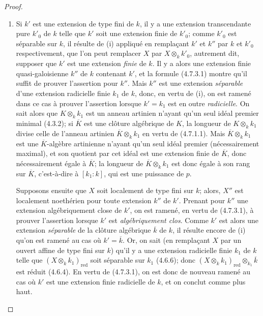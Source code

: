 \begin{proof}
\begin{enumerate}
\item[(ii)] Si $k'$ est une extension de type fini de $k$, il y a une
extension transcendante pure $k'_0$ de $k$ telle que $k'$ soit une extension
finie de $k'_0$; comme $k'_0$ est séparable sur $k$, il résulte de (i)
appliqué en remplaçant $k'$ et $k''$ par $k$ et $k'_0$ respectivement, que
l'on peut remplacer $X$ par $X\otimes_k k'_0$, autrement dit, supposer que
$k'$ est une extension \emph{finie} de $k$. Il y a alors une extension finie
quasi-galoisienne $k''$ de $k$ contenant $k'$, et la formule (4.7.3.1) montre
qu'il suffit de prouver l'assertion pour $k''$. Mais $k''$ est une extension
\emph{séparable} d'une extension radicielle finie $k_1$ de $k$, donc, en vertu de
(i), on est ramené dans ce cas à prouver l'assertion lorsque $k'=k_1$ est en
outre \emph{radicielle}. On sait alors que $K\otimes_k k_1$ est un anneau artinien
n'ayant qu'un seul idéal premier minimal (4.3.2); si $\overline K$ est une
clôture algébrique de $K$, la longueur de $K\otimes_k k_1$ divise celle de
l'anneau artinien $\overline K\otimes_k k_1$ en vertu de (4.7.1.1). Mais
$\overline K\otimes_k k_1$ est une $\overline K$-algèbre artinienne n'ayant
qu'un seul idéal premier (nécessairement maximal), et son quotient par cet
idéal est une extension finie de $\overline K$, donc nécessairement égale à
$\overline K$; la longueur de $\overline K\otimes_k k_1$ est donc égale à son
rang sur $\overline K$, c'est-à-dire à $[k_1:k]$, qui est une puissance de
$p$.

Supposons ensuite que $X$ soit localement de type fini sur $k$; alors, $X''$
est localement noethérien pour toute extension $k''$ de $k'$. Prenant pour
$k''$ une extension algébriquement close de $k'$, on est ramené, en vertu de
(4.7.3.1), à prouver l'assertion lorsque $k'$ est \emph{algébriquement clos}. Comme
$k'$ est alors une extension \emph{séparable} de la clôture algébrique $\overline k$
de $k$, il résulte encore de (i) qu'on est ramené au cas où
$k'=\overline k$. Or, on sait (en remplaçant $X$ par un ouvert affine de type
fini sur $k$) qu'il y a une extension radicielle
finie $k_1$ de $k$ telle que
$(X\otimes_k k_1)_{\mathrm{red}}$ soit séparable sur $k_1$ (4.6.6); donc
$(X\otimes_k k_1)_{\mathrm{red}}\otimes_{k_1}\overline k$ est réduit
(4.6.4). En vertu de (4.7.3.1), on est donc de nouveau ramené au cas où $k'$
est une extension finie radicielle de $k$, et on conclut comme plus haut.


\end{enumerate}
\end{proof}
